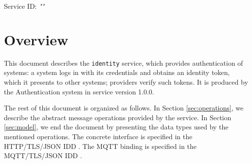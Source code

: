 \documentclass[a4paper]{arrowhead}
\begin{document}
\sloppy

\ArrowheadSetup

\begin{center}
  \vspace*{1cm}
  \huge{\arrowtitle}

  \vspace*{0.2cm}
  \LARGE{\arrowtype}
  \vspace*{1cm}

  \Large{Service ID: \textit{"\arrowid"}}

  \vspace*{\fill}


  \vspace*{1cm}
  \vspace*{\fill}

  \begin{abstract}
    This document describes the \texttt{identity} service, version 1.0.0, produced by the Authentication core system of Arrowhead 5.2.2.
  \end{abstract}

  \vspace*{1cm}
\end{center}

\newpage

\tableofcontents
\newpage

\section{Overview}
\label{sec:overview}

This document describes the \texttt{identity} service, which provides authentication of systems: a system logs in with its credentials and obtains an identity token, which it presents to other systems; providers verify such tokens.
It is produced by the Authentication system \cite{auth-sysd} in service version 1.0.0.

The rest of this document is organized as follows.
In Section \ref{sec:operations}, we describe the abstract message operations provided by the service.
In Section \ref{sec:model}, we end the document by presenting the data types used by the mentioned operations.
The concrete interface is specified in the HTTP/TLS/JSON IDD \cite{auth-identity-http-idd}. The MQTT binding is specified in the MQTT/TLS/JSON IDD \cite{auth-identity-mqtt-idd}.
\end{document}
